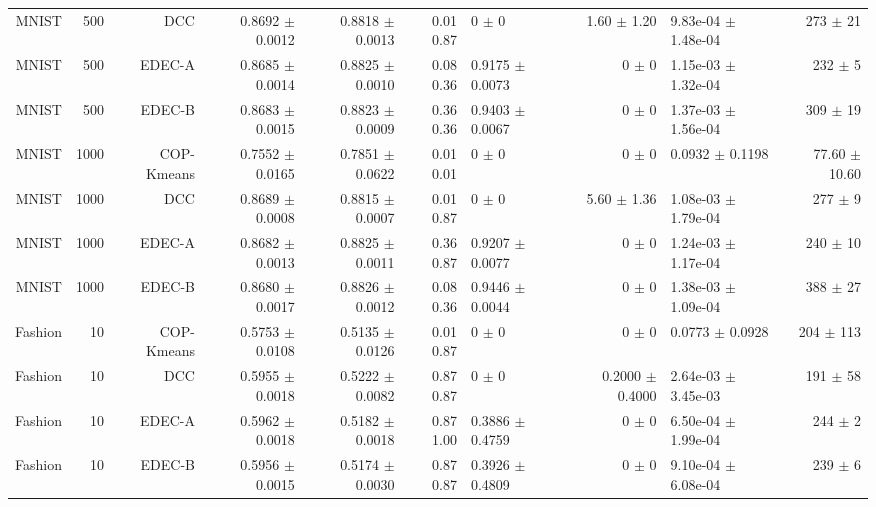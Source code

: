 \begin{table}[ht]
{\begin{tabular}{ | r | r | r | r | r | r | H  r | H  r |}
MNIST & 500 & DCC & { \color{green} 0.8692 $\pm$ 0.0012} & { \color{blue} 0.8818 $\pm$ 0.0013} & { \color{green} 0.01} { \color{green} 0.87} & 0 $\pm$ 0 & 1.60 $\pm$ 1.20 & 9.83e-04 $\pm$ 1.48e-04 & 273 $\pm$ 21 \\ 
MNIST & 500 & EDEC-A & { \color{blue} 0.8685 $\pm$ 0.0014} & { \color{green} 0.8825 $\pm$ 0.0010} & { \color{green} 0.08} { \color{green} 0.36} & 0.9175 $\pm$ 0.0073 & 0 $\pm$ 0 & 1.15e-03 $\pm$ 1.32e-04 & 232 $\pm$ 5 \\ 
MNIST & 500 & EDEC-B & { \color{blue} 0.8683 $\pm$ 0.0015} & { \color{blue} 0.8823 $\pm$ 0.0009} & { \color{green} 0.36} { \color{green} 0.36} & 0.9403 $\pm$ 0.0067 & 0 $\pm$ 0 & 1.37e-03 $\pm$ 1.56e-04 & 309 $\pm$ 19 \\ \hline 
MNIST & 1000 & COP-Kmeans & 0.7552 $\pm$ 0.0165 & 0.7851 $\pm$ 0.0622 & { \color{black}0.01} { \color{black}0.01} & 0 $\pm$ 0 & 0 $\pm$ 0 & 0.0932 $\pm$ 0.1198 & 77.60 $\pm$ 10.60 \\ 
MNIST & 1000 & DCC & { \color{green} 0.8689 $\pm$ 0.0008} & { \color{blue} 0.8815 $\pm$ 0.0007} & { \color{green} 0.01} { \color{green} 0.87} & 0 $\pm$ 0 & 5.60 $\pm$ 1.36 & 1.08e-03 $\pm$ 1.79e-04 & 277 $\pm$ 9 \\ 
MNIST & 1000 & EDEC-A & { \color{blue} 0.8682 $\pm$ 0.0013} & { \color{blue} 0.8825 $\pm$ 0.0011} & { \color{green} 0.36} { \color{green} 0.87} & 0.9207 $\pm$ 0.0077 & 0 $\pm$ 0 & 1.24e-03 $\pm$ 1.17e-04 & 240 $\pm$ 10 \\ 
MNIST & 1000 & EDEC-B & { \color{blue} 0.8680 $\pm$ 0.0017} & { \color{green} 0.8826 $\pm$ 0.0012} & { \color{green} 0.08} { \color{green} 0.36} & 0.9446 $\pm$ 0.0044 & 0 $\pm$ 0 & 1.38e-03 $\pm$ 1.09e-04 & 388 $\pm$ 27 \\ \hline 
Fashion & 10 & COP-Kmeans & 0.5753 $\pm$ 0.0108 & { \color{blue} 0.5135 $\pm$ 0.0126} & { \color{black}0.01} { \color{black}0.87} & 0 $\pm$ 0 & 0 $\pm$ 0 & 0.0773 $\pm$ 0.0928 & 204 $\pm$ 113 \\ 
Fashion & 10 & DCC & { \color{blue} 0.5955 $\pm$ 0.0018} & { \color{green} 0.5222 $\pm$ 0.0082} & { \color{black}0.87} { \color{green} 0.87} & 0 $\pm$ 0 & 0.2000 $\pm$ 0.4000 & 2.64e-03 $\pm$ 3.45e-03 & 191 $\pm$ 58 \\ 
Fashion & 10 & EDEC-A & { \color{green} 0.5962 $\pm$ 0.0018} & { \color{blue} 0.5182 $\pm$ 0.0018} & { \color{black}0.87} { \color{black}1.00} & 0.3886 $\pm$ 0.4759 & 0 $\pm$ 0 & 6.50e-04 $\pm$ 1.99e-04 & 244 $\pm$ 2 \\ 
Fashion & 10 & EDEC-B & { \color{blue} 0.5956 $\pm$ 0.0015} & { \color{blue} 0.5174 $\pm$ 0.0030} & { \color{black}0.87} { \color{black}0.87} & 0.3926 $\pm$ 0.4809 & 0 $\pm$ 0 & 9.10e-04 $\pm$ 6.08e-04 & 239 $\pm$ 6 \\ \hline 

\end{tabular}}
\end{table}
